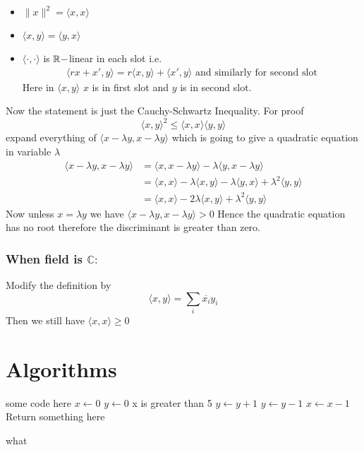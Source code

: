 \documentclass{report}
\newcommand{\bbC}{\mathbb{C}}	\newcommand{\bbD}{\mathbb{D}}
\begin{document}
{	\begin{note}
		\begin{itemize}
			\item $\|x\|^2=\langle x,x\rangle$
			\item $\langle x,y\rangle=\langle y,x\rangle$
			\item $\langle \cdot,\cdot\rangle$ is $\mathbb{R}-$linear in each slot i.e. \begin{align*}
				      \langle rx+x',y\rangle=r\langle x,y\rangle+\langle x',y\rangle	\text{ and similarly for second slot}
			      \end{align*}Here in $\langle x,y\rangle$ $x$ is in first slot and $y$ is in second slot.
		\end{itemize}
	\end{note}Now the statement is just the Cauchy-Schwartz Inequality. For proof $$\langle x,y\rangle^2\leq \langle x,x\rangle\langle y,y\rangle $$ expand everything of $\langle x-\lambda y,x-\lambda y\rangle$ which is going to give a quadratic equation in variable $\lambda $ \begin{align*}
		\langle x-\lambda y,x-\lambda y\rangle & =\langle x,x-\lambda y\rangle-\lambda\langle y,x-\lambda y\rangle                                       \\
		                                       & =\langle x ,x\rangle -\lambda\langle x,y\rangle -\lambda\langle y,x\rangle +\lambda^2\langle y,y\rangle \\
		                                       & =\langle x,x\rangle -2\lambda\langle x,y\rangle+\lambda^2\langle y,y\rangle
	\end{align*}Now unless $x=\lambda y$ we have $\langle x-\lambda y,x-\lambda y\rangle>0$ Hence the quadratic equation has no root therefore the discriminant is greater than zero.

	\subsubsection*{\textbf{When field is $\bbC:$}}Modify the definition by $$\langle x,y\rangle=\sum_i\overline{x_i}y_i$$Then we still have $\langle x,x\rangle\geq 0$}

\section{Algorithms}
\begin{algorithm}[H]
\SetAlgoLined
\SetNoFillComment
{}
\vspace{3mm}
some code here\;
$x \leftarrow 0$\;
$y \leftarrow 0$\;
 {
    x is greater than 5 
}
 {
    $y \leftarrow y + 1$\;
}
 {
    $y \leftarrow y - 1$\;
}
 {
    $x \leftarrow x - 1$\;
}
\Return Return something here\;
\caption{what}
\end{algorithm}
\fi
\end{document}
